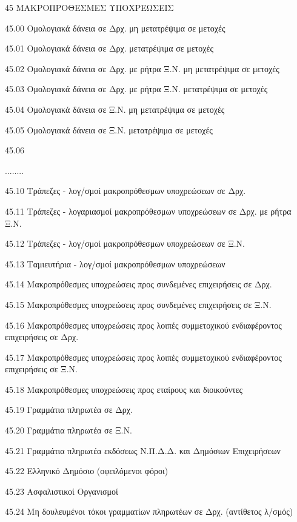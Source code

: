 \documentclass[A4,10pt,greek]{book}
\begin{document}
 45   ΜΑΚΡΟΠΡΟΘΕΣΜΕΣ ΥΠΟΧΡΕΩΣΕΙΣ 

        45.00   Ομολογιακά δάνεια σε Δρχ. μη μετατρέψιμα σε μετοχές 

        45.01   Ομολογιακά δάνεια σε Δρχ. μετατρέψιμα σε μετοχές 

        45.02   Ομολογιακά δάνεια σε Δρχ. με ρήτρα Ξ.Ν. μη μετατρέψιμα
                     σε μετοχές

        45.03   Ομολογιακά δάνεια σε Δρχ. με ρήτρα Ξ.Ν. μετατρέψιμα σε μετοχές

        45.04   Ομολογιακά δάνεια σε Ξ.Ν. μη μετατρέψιμα σε μετοχές

        45.05   Ομολογιακά δάνεια σε Ξ.Ν. μετατρέψιμα σε μετοχές 

        45.06

        ........

        45.10   Τράπεζες - λογ/σμοί μακροπρόθεσμων υποχρεώσεων σε Δρχ. 

        45.11   Τράπεζες - λογαριασμοί μακροπρόθεσμων υποχρεώσεων σε Δρχ.
                     με ρήτρα Ξ.Ν. 

        45.12   Τράπεζες - λογ/σμοί μακροπρόθεσμων υποχρεώσεων σε Ξ.Ν. 

        45.13   Ταμιευτήρια - λογ/σμοί μακροπρόθεσμων υποχρεώσεων

        45.14   Μακροπρόθεσμες υποχρεώσεις προς συνδεμένες επιχειρήσεις σε Δρχ.

        45.15   Μακροπρόθεσμες υποχρεώσεις προς συνδεμένες επιχειρήσεις σε Ξ.Ν.

        45.16   Μακροπρόθεσμες υποχρεώσεις προς λοιπές συμμετοχικού
                     ενδιαφέροντος επιχειρήσεις σε Δρχ. 

        45.17   Μακροπρόθεσμες υποχρεώσεις προς λοιπές συμμετοχικού
                     ενδιαφέροντος επιχειρήσεις σε Ξ.Ν. 

        45.18   Μακροπρόθεσμες υποχρεώσεις προς εταίρους και διοικούντες 

        45.19   Γραμμάτια πληρωτέα σε Δρχ.

        45.20   Γραμμάτια πληρωτέα σε Ξ.Ν.

        45.21   Γραμμάτια πληρωτέα εκδόσεως Ν.Π.Δ.Δ. και Δημόσιων
                     Επιχειρήσεων

        45.22   Ελληνικό Δημόσιο (οφειλόμενοι φόροι) 

        45.23   Ασφαλιστικοί Οργανισμοί 

        45.24   Μη δουλευμένοι τόκοι γραμματίων πληρωτέων σε Δρχ.
                     (αντίθετος λ/σμός)
\end{document}
